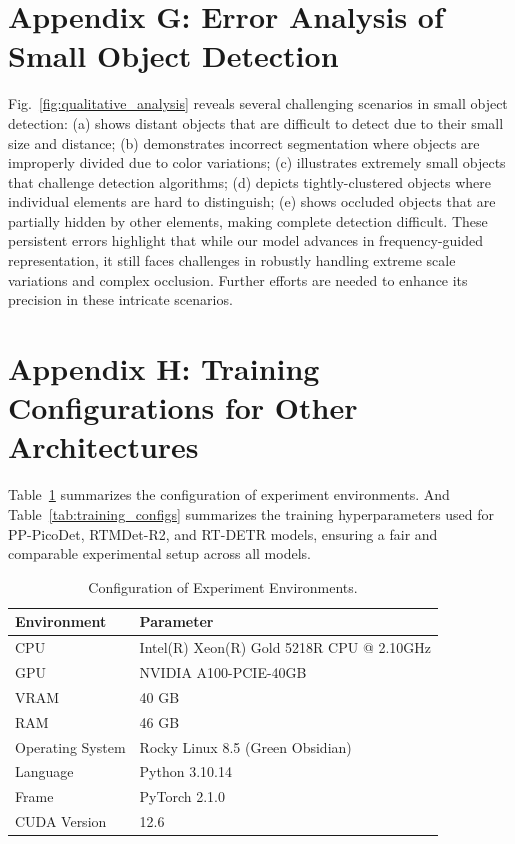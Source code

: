\documentclass{article}
\theoremstyle{plain}
\theoremstyle{definition}
\theoremstyle{remark}
\begin{document}
\section{Appendix G: Error Analysis of Small Object Detection}
\label{sec:appendix_g_error_analysis}

Fig.~\ref{fig:qualitative_analysis} reveals several challenging scenarios in small object detection: (a) shows distant objects that are difficult to detect due to their small size and distance; (b) demonstrates incorrect segmentation where objects are improperly divided due to color variations; (c) illustrates extremely small objects that challenge detection algorithms; (d) depicts tightly-clustered objects where individual elements are hard to distinguish; (e) shows occluded objects that are partially hidden by other elements, making complete detection difficult. These persistent errors highlight that while our model advances in frequency-guided representation, it still faces challenges in robustly handling extreme scale variations and complex occlusion. Further efforts are needed to enhance its precision in these intricate scenarios.


\section{Appendix H: Training Configurations for Other Architectures}
\label{sec:appendix_h_training_configs}

Table~\ref{tab:config} summarizes the configuration of experiment environments. And
Table~\ref{tab:training_configs} summarizes the training hyperparameters used for PP-PicoDet, RTMDet-R2, and RT-DETR models, ensuring a fair and comparable experimental setup across all models.

\begin{table}[H]
  \centering
  \caption{Configuration of Experiment Environments.}
  \label{tab:config}
  \setlength{\tabcolsep}{6pt}
  \renewcommand{\arraystretch}{1.05}
  \fontsize{9pt}{10.5pt}\selectfont
  \begin{tabular}{@{}l p{}@{}}
      \toprule
      \rowcolor{blue!5}\textbf{Environment} & \textbf{Parameter} \\
      \midrule
      CPU              & Intel(R) Xeon(R) Gold 5218R CPU @ 2.10GHz \\
      GPU              & NVIDIA A100-PCIE-40GB \\
      VRAM             & 40 GB \\
      RAM              & 46 GB \\
      Operating System & Rocky Linux 8.5 (Green Obsidian) \\
      Language         & Python 3.10.14 \\
      Frame            & PyTorch 2.1.0 \\
      CUDA Version     & 12.6 \\
      \bottomrule
  \end{tabular}
  \vspace{-1mm}
\end{table}
\end{document}
